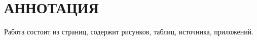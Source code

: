\chapter*{АННОТАЦИЯ}

Работа состоит из \pageref{LastPage} страниц, содержит  рисунков,  таблиц, источника, приложений.